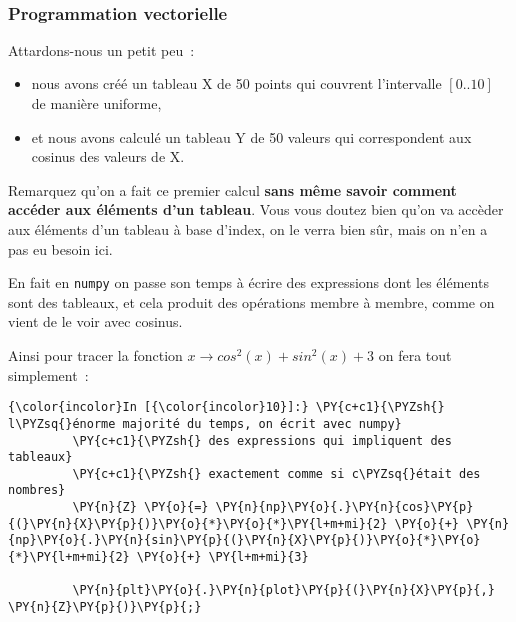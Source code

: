     \begin{center}
    \end{center}
    { \hspace*{\fill} \\}
    
    \hypertarget{programmation-vectorielle}{%
\subsubsection{Programmation
vectorielle}\label{programmation-vectorielle}}

    Attardons-nous un petit peu~:

\begin{itemize}
\tightlist
\item
  nous avons créé un tableau X de 50 points qui couvrent l'intervalle
  \([0..10]\) de manière uniforme,
\item
  et nous avons calculé un tableau Y de 50 valeurs qui correspondent aux
  cosinus des valeurs de X.
\end{itemize}

    Remarquez qu'on a fait ce premier calcul \textbf{sans même savoir
comment accéder aux éléments d'un tableau}. Vous vous doutez bien qu'on
va accèder aux éléments d'un tableau à base d'index, on le verra bien
sûr, mais on n'en a pas eu besoin ici.

En fait en \texttt{numpy} on passe son temps à écrire des expressions
dont les éléments sont des tableaux, et cela produit des opérations
membre à membre, comme on vient de le voir avec cosinus.

Ainsi pour tracer la fonction
\(x \longrightarrow cos^2(x) + sin^2(x) + 3\) on fera tout simplement~:

    \begin{Verbatim}[commandchars=\\\{\}]
{\color{incolor}In [{\color{incolor}10}]:} \PY{c+c1}{\PYZsh{} l\PYZsq{}énorme majorité du temps, on écrit avec numpy}
         \PY{c+c1}{\PYZsh{} des expressions qui impliquent des tableaux}
         \PY{c+c1}{\PYZsh{} exactement comme si c\PYZsq{}était des nombres}
         \PY{n}{Z} \PY{o}{=} \PY{n}{np}\PY{o}{.}\PY{n}{cos}\PY{p}{(}\PY{n}{X}\PY{p}{)}\PY{o}{*}\PY{o}{*}\PY{l+m+mi}{2} \PY{o}{+} \PY{n}{np}\PY{o}{.}\PY{n}{sin}\PY{p}{(}\PY{n}{X}\PY{p}{)}\PY{o}{*}\PY{o}{*}\PY{l+m+mi}{2} \PY{o}{+} \PY{l+m+mi}{3}
         
         \PY{n}{plt}\PY{o}{.}\PY{n}{plot}\PY{p}{(}\PY{n}{X}\PY{p}{,} \PY{n}{Z}\PY{p}{)}\PY{p}{;}
\end{Verbatim}


